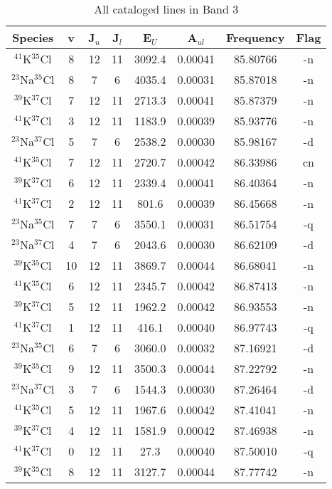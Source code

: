 \begin{table*}[htp]
\centering
\caption{All cataloged lines in Band 3}
\begin{tabular}{cccccccc}
\label{tab:all_detections_B3}
Species & v & J$_u$ & J$_l$ & E$_U$ & A$_{ul}$ & Frequency & Flag \\
\hline
$^{41}$K$^{35}$Cl & 8 & 12 & 11 & 3092.4 & 0.00041 & 85.80766 & -n \\
$^{23}$Na$^{35}$Cl & 8 & 7 & 6 & 4035.4 & 0.00031 & 85.87018 & -n \\
$^{39}$K$^{37}$Cl & 7 & 12 & 11 & 2713.3 & 0.00041 & 85.87379 & -n \\
$^{41}$K$^{37}$Cl & 3 & 12 & 11 & 1183.9 & 0.00039 & 85.93776 & -n \\
$^{23}$Na$^{37}$Cl & 5 & 7 & 6 & 2538.2 & 0.00030 & 85.98167 & -d \\
$^{41}$K$^{35}$Cl & 7 & 12 & 11 & 2720.7 & 0.00042 & 86.33986 & cn \\
$^{39}$K$^{37}$Cl & 6 & 12 & 11 & 2339.4 & 0.00041 & 86.40364 & -n \\
$^{41}$K$^{37}$Cl & 2 & 12 & 11 & 801.6 & 0.00039 & 86.45668 & -n \\
$^{23}$Na$^{35}$Cl & 7 & 7 & 6 & 3550.1 & 0.00031 & 86.51754 & -q \\
$^{23}$Na$^{37}$Cl & 4 & 7 & 6 & 2043.6 & 0.00030 & 86.62109 & -d \\
$^{39}$K$^{35}$Cl & 10 & 12 & 11 & 3869.7 & 0.00044 & 86.68041 & -n \\
$^{41}$K$^{35}$Cl & 6 & 12 & 11 & 2345.7 & 0.00042 & 86.87413 & -n \\
$^{39}$K$^{37}$Cl & 5 & 12 & 11 & 1962.2 & 0.00042 & 86.93553 & -n \\
$^{41}$K$^{37}$Cl & 1 & 12 & 11 & 416.1 & 0.00040 & 86.97743 & -q \\
$^{23}$Na$^{35}$Cl & 6 & 7 & 6 & 3060.0 & 0.00032 & 87.16921 & -d \\
$^{39}$K$^{35}$Cl & 9 & 12 & 11 & 3500.3 & 0.00044 & 87.22792 & -n \\
$^{23}$Na$^{37}$Cl & 3 & 7 & 6 & 1544.3 & 0.00030 & 87.26464 & -d \\
$^{41}$K$^{35}$Cl & 5 & 12 & 11 & 1967.6 & 0.00042 & 87.41041 & -n \\
$^{39}$K$^{37}$Cl & 4 & 12 & 11 & 1581.9 & 0.00042 & 87.46938 & -n \\
$^{41}$K$^{37}$Cl & 0 & 12 & 11 & 27.3 & 0.00040 & 87.50010 & -q \\
$^{39}$K$^{35}$Cl & 8 & 12 & 11 & 3127.7 & 0.00044 & 87.77742 & -n \\

\end{tabular}
\end{table*}
